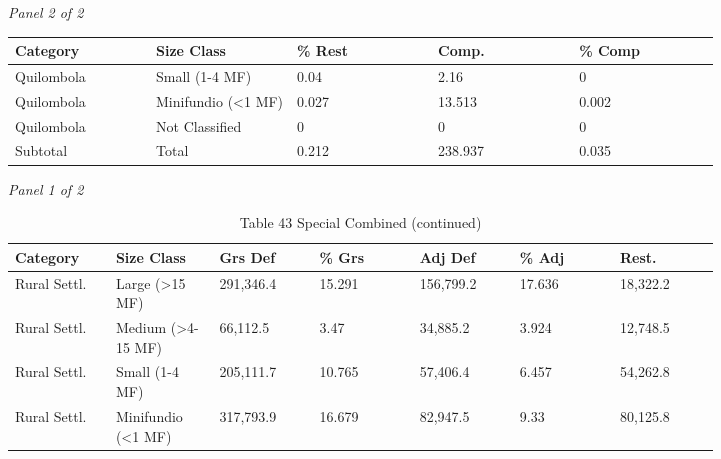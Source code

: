 \documentclass[12pt]{article}
\begin{document}
\begin{landscape}
\begin{table}[H]
\textit{Panel 2 of 2}\\[2pt]
{\fontsize{12}{14}\selectfont
\setlength{\tabcolsep}{3pt}
\renewcommand{\arraystretch}{1.08}
\begin{tabular}{p{0.164\linewidth}p{0.164\linewidth}p{0.164\linewidth}p{0.164\linewidth}p{0.164\linewidth}}
\toprule
Category & Size Class & \% Rest & Comp. & \% Comp \\
\midrule
Quilombola & Small (1-4 MF) & 0.04 & 2.16 & 0 \\
Quilombola & Minifundio (<1 MF) & 0.027 & 13.513 & 0.002 \\
Quilombola & Not Classified & 0 & 0 & 0 \\
Subtotal & Total & 0.212 & 238.937 & 0.035 \\
\bottomrule
\end{tabular}
}
\end{table}
\begin{table}[H]
\centering
\caption{Table 43 Special Combined (continued)}
\textit{Panel 1 of 2}\\[2pt]
{\fontsize{12}{14}\selectfont
\setlength{\tabcolsep}{3pt}
\renewcommand{\arraystretch}{1.08}
\begin{tabular}{p{0.117\linewidth}p{0.117\linewidth}p{0.117\linewidth}p{0.117\linewidth}p{0.117\linewidth}p{0.117\linewidth}p{0.117\linewidth}}
\toprule
Category & Size Class & Grs Def & \% Grs & Adj Def & \% Adj & Rest. \\
\midrule
Rural Settl. & Large (>15 MF) & 291,346.4 & 15.291 & 156,799.2 & 17.636 & 18,322.2 \\
Rural Settl. & Medium (>4-15 MF) & 66,112.5 & 3.47 & 34,885.2 & 3.924 & 12,748.5 \\
Rural Settl. & Small (1-4 MF) & 205,111.7 & 10.765 & 57,406.4 & 6.457 & 54,262.8 \\
Rural Settl. & Minifundio (<1 MF) & 317,793.9 & 16.679 & 82,947.5 & 9.33 & 80,125.8 \\
\bottomrule
\end{tabular}
}

\vspace{0.6em}


\end{table}
\end{landscape}
\end{document}
